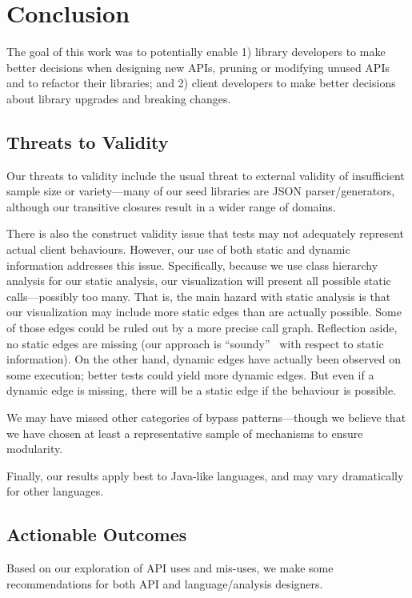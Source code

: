 \chapter{Conclusion}
\label{sec:conclusion}
The goal of this work was to potentially enable 1) library developers to make better
decisions when designing new APIs, pruning or modifying unused APIs and to refactor their
libraries; and 2) client developers to make better decisions about library
upgrades and breaking changes.

\section{Threats to Validity}
Our threats to validity include the usual threat to external validity
of insufficient sample size or variety---many of our seed libraries
are JSON parser/generators, although our transitive closures result in
a wider range of domains.

There is also the construct validity issue that tests may
not adequately represent actual client behaviours. However, our use of both static
and dynamic information addresses this issue. Specifically, because we use
class hierarchy analysis for our static analysis, our visualization will present
all possible static calls---possibly too many. 
That is, the main hazard with static analysis is that our visualization may include more
static edges than are actually possible. Some of those edges could be ruled out by a more
precise call graph. Reflection aside, no static edges
are missing (our approach is ``soundy''~\cite{livshits15:_in_defen_sound} with respect to static information). 
On the other hand, dynamic edges have actually been observed
on some execution; better tests could yield more dynamic edges. But even if
a dynamic edge is missing, there will be a static edge if the behaviour is possible.

We may have missed other categories of bypass patterns---though we believe
that we have chosen at least a representative sample of mechanisms to ensure
modularity. 

Finally, our results apply best to Java-like languages, and
may vary dramatically for other languages.

\section{Actionable Outcomes}
Based on our exploration of API uses and mis-uses, we make some recommendations
for both API and language/analysis designers.

